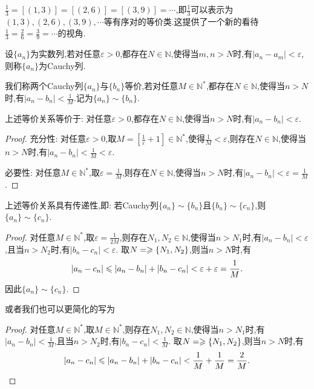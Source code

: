 $\frac{1}{3} = [(1,3)] = [(2,6)] = [(3,9)] = \cdots$,即$\frac{1}{3}$可以表示为$(1,3),(2,6),(3,9),\cdots$等有序对的等价类.这提供了一个新的看待$\frac{1}{3} = \frac{2}{6} = \frac{3}{9} = \cdots$的视角.

\begin{definition}
    [Cauchy列] 设$\{ a_n \}$为实数列,若对任意$\varepsilon > 0$,都存在$N \in \mathbb{N}$,使得当$m,n > N$时,有$|a_n - a_m| < \varepsilon$,则称$\{ a_n \}$为Cauchy列.
\end{definition}

我们称两个Cauchy列$\{ a_n \}$与$\{ b_n \}$等价,若对任意$M \in \mathbb{N}^*$,都存在$N \in \mathbb{N}$,使得当$n > N$时,有$|a_n - b_n| < \frac{1}{M}$.记为$\{ a_n \} \sim \{ b_n \}$.

\begin{proposition}
    上述等价关系等价于: 对任意$\varepsilon > 0$,都存在$N \in \mathbb{N}$,使得当$n > N$时,有$|a_n - b_n| < \varepsilon$.
\end{proposition}

\begin{proof}
    充分性: 对任意$\varepsilon > 0$,取$M = \left[ \frac{1}{\varepsilon} + 1\right]\in \mathbb{N}^*$,使得$\frac{1}{M} < \varepsilon$,则存在$N \in \mathbb{N}$,使得当$n > N$时,有$|a_n - b_n| < \frac{1}{M} < \varepsilon$.

    必要性: 对任意$M \in \mathbb{N}^*$,取$\varepsilon = \frac{1}{M}$,则存在$N \in \mathbb{N}$,使得当$n > N$时,有$|a_n - b_n| < \varepsilon = \frac{1}{M}$.
\end{proof}

\begin{proposition}
    上述等价关系具有传递性,即: 若Cauchy列$\{ a_n \} \sim \{ b_n \}$且$\{ b_n \} \sim \{ c_n \}$,则$\{ a_n \} \sim \{ c_n \}$.
\end{proposition}

\begin{proof}
    对任意$M \in \mathbb{N}^*$,取$\varepsilon = \frac{1}{2M}$,则存在$N_1,N_2 \in \mathbb{N}$,使得当$n > N_1$时,有$|a_n - b_n| < \varepsilon$,且当$n > N_2$时,有$|b_n - c_n| < \varepsilon$. 取$N = \geqslant\{N_1,N_2\}$,则当$n > N$时,有
    $$|a_n - c_n| \leqslant |a_n - b_n| + |b_n - c_n| < \varepsilon + \varepsilon = \frac{1}{M}.$$
    因此$\{ a_n \} \sim \{ c_n \}$.
\end{proof}

或者我们也可以更简化的写为
\begin{proof}
    对任意$M \in \mathbb{N}^*$,取$M \in \mathbb{N}^*$,则存在$N_1,N_2 \in \mathbb{N}$,使得当$n > N_1$时,有$|a_n - b_n| < \frac{1}{M}$,且当$n > N_2$时,有$|b_n - c_n| < \frac{1}{M}$. 取$N = \geqslant\{N_1,N_2\}$,则当$n > N$时,有
    $$|a_n - c_n| \leqslant |a_n - b_n| + |b_n - c_n| < \frac{1}{M} + \frac{1}{M} = \frac{2}{M}.$$
\end{proof}

